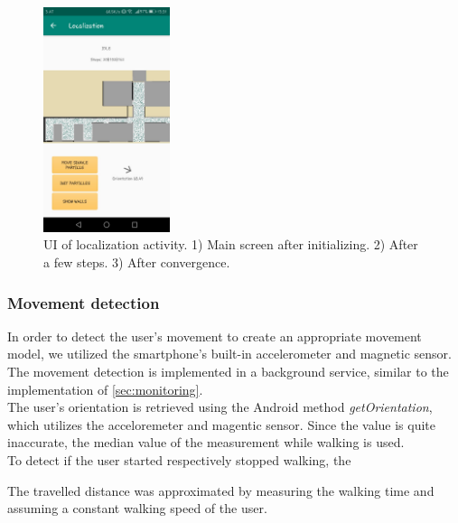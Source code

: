 \documentclass[12pt]{article}
\begin{document}
\begin{figure}
	\centering
	\includegraphics[width=140px]{images/localization.jpeg}
	\caption{UI of localization activity. 1) Main screen after initializing. 2) After a few steps. 3) After convergence. }
	\label{fig:localization}
\end{figure}

\subsubsection*{Movement detection}\label{sec:movement}
In order to detect the user's movement to create an appropriate movement model, we utilized the smartphone's built-in accelerometer and magnetic sensor. The movement detection is implemented in a background service, similar to the implementation of \ref{sec:monitoring}.\\
The user's orientation is retrieved using the Android method \textit{getOrientation}, which utilizes the acceloremeter and magentic sensor. Since the value is quite inaccurate, the median value of the measurement while walking is used.\\
To detect if the user started respectively stopped walking, the %

The travelled distance was approximated by measuring the walking time and assuming a constant walking speed of the user.
\end{document}
